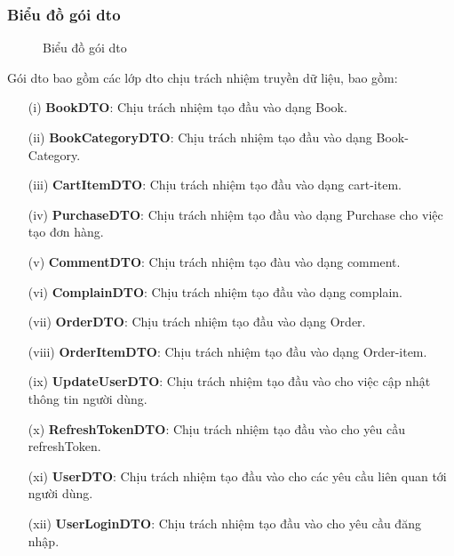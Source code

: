 \documentclass[../DoAn.tex]{subfiles}
\begin{document}
\subsubsection{Biểu đồ gói dto}

\begin{figure}[H]
    \centering
    \caption{Biểu đồ gói dto}
    \label{fig:Fig6}
\end{figure}
Gói dto bao gồm các lớp dto chịu trách nhiệm truyền dữ liệu, bao gồm:
\begin{enumerate}
    \item [(i)] \textbf{BookDTO}: Chịu trách nhiệm tạo đầu vào dạng Book.
    \item [(ii)]\textbf{BookCategoryDTO}: Chịu trách nhiệm tạo đầu vào dạng Book-Category.
    \item[(iii)] \textbf{CartItemDTO}: Chịu trách nhiệm tạo đầu vào dạng cart-item.
    \item[(iv)] \textbf{PurchaseDTO}: Chịu trách nhiệm tạo đầu vào dạng Purchase cho việc tạo đơn hàng.
    \item[(v)] \textbf{CommentDTO}: Chịu trách nhiệm tạo đàu vào dạng comment.
    \item[(vi)] \textbf{ComplainDTO}: Chịu trách nhiệm tạo đầu vào dạng complain.
    \item[(vii)] \textbf{OrderDTO}: Chịu trách nhiệm tạo đầu vào dạng Order.
    \item[(viii)] \textbf{OrderItemDTO}: Chịu trách nhiệm tạo đầu vào dạng Order-item.
    \item[(ix)] \textbf{UpdateUserDTO}: Chịu trách nhiệm tạo đầu vào cho việc cập nhật thông tin người dùng.
    \item[(x)] \textbf{RefreshTokenDTO}: Chịu trách nhiệm tạo đầu vào cho yêu cầu refreshToken.
    \item[(xi)] \textbf{UserDTO}: Chịu trách nhiệm tạo đầu vào cho các yêu cầu liên quan tới người dùng.
    \item[(xii)] \textbf{UserLoginDTO}: Chịu trách nhiệm tạo đầu vào cho yêu cầu đăng nhập.
\end{enumerate}
\end{document}
